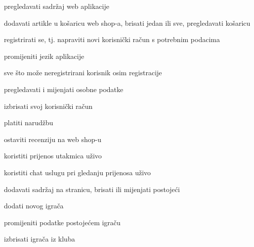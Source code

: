 			
			\begin{packed_enum}
				\item  {}
				
				\begin{packed_enum}
					
					\item pregledavati sadržaj web aplikacije
					\item dodavati artikle u košaricu web shop-a, brisati jedan ili sve, pregledavati košaricu
					\item registrirati se, tj. napraviti novi korisnički račun s potrebnim podacima
					\item promijeniti jezik aplikacije				
				\end{packed_enum}
			
				\item  {}
				
				\begin{packed_enum}
					
					\item sve što može neregistrirani korisnik osim registracije
					\item pregledavati i mijenjati osobne podatke
					\item izbrisati svoj korisnički račun
					\item platiti narudžbu
					\item ostaviti recenziju na web shop-u
					\item koristiti prijenos utakmica uživo
					\item koristiti chat uslugu pri gledanju prijenosa uživo
					
				\end{packed_enum}
			\item  {}
			
			\begin{packed_enum}
				
				\item dodavati sadržaj na stranicu, brisati ili mijenjati postojeći
				\item dodati novog igrača
				\item promijeniti podatke postojećem igraču
				\item izbrisati igrača iz kluba
				
			\end{packed_enum}
		\item  {}
		

\end{packed_enum}
